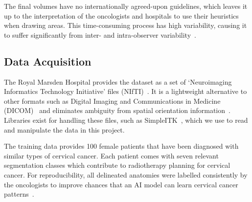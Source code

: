 \documentclass[11pt,twoside]{report}
\begin{document}
The final volumes have no internationally agreed-upon guidelines, which leaves it up to the interpretation of the oncologists and hospitals to use their heuristics when drawing areas.  This time-consuming process has high variability, causing it to suffer significantly from inter- and intra-observer variability~\cite{Lin2021-oz}. 

\subsection{Data Acquisition}

The Royal Marsden Hospital provides the dataset as a set of `Neuroimaging Informatics Technology Initiative' files (NIfTI)~\cite{file-formats}. It is a lightweight alternative to other formats such as Digital Imaging and Communications in Medicine (DICOM)~\cite{file-formats} and eliminates ambiguity from spatial orientation information~\cite{dicom-to-nifti-conversion}. Libraries exist for handling these files, such as SimpleITK~\cite{SimpleITK-paper}, which we use to read and manipulate the data in this project. %

The training data provides 100 female patients that have been diagnosed with similar types of cervical cancer. Each patient comes with seven relevant segmentation classes which contribute to radiotherapy planning for cervical cancer. For reproducibility, all delineated anatomies were labelled consistently by the oncologists to improve chances that an AI model can learn cervical cancer patterns~\cite{AMLART-data}. 



\end{document}

